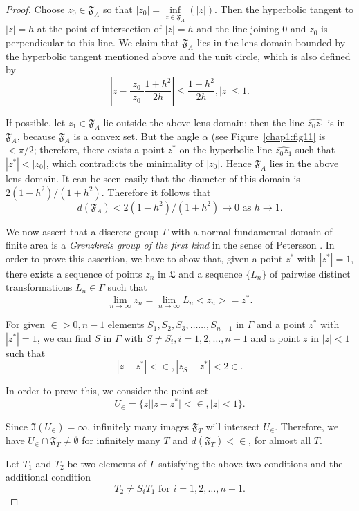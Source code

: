 \begin{proof}
Choose $z_0 \in \mathfrak{F}_A$ so that $|z_0| =
\inf\limits_{z\in \mathfrak{F}_A}(|z|)$. Then the hyperbolic tangent
to $|z|=h$ at the point of intersection of $|z|=h$ and the line
joining $0$ and $z_0$ is perpendicular to this line. We claim that
$\mathfrak{F}_A$ lies in the lens domain bounded by the hyperbolic
tangent mentioned above and the unit circle, which is also defined by 
$$
\left| z - \frac{z_0}{|z_0|} \frac{1+h^2}{2h}\right| \leq
\frac{1-h^2}{2h}, |z| \leq 1.
$$

If possible, let $z_1 \in \mathfrak{F}_A$ lie outside the
above lens domain; then the line $\widehat{z_0z_1}$ is in
$\mathfrak{F}_A$, because $\mathfrak{F}_A$ is a convex set. But the
angle $\alpha$ (see Figure~\ref{chap1:fig11} is $<\pi/2$; therefore, there exists a
point $z^{\ast}$ on the hyperbolic line $\widehat{z_0z_1}$ such that
$|z^{\ast}|<|z_0|$, which contradicts the minimality of $|z_0|$. Hence
$\mathfrak{F}_A$ lies in the above lens domain. It can be seen easily
that the diameter of this domain is $2(1-h^2)/(1+h^2)$. Therefore it
follows that 
$$
d(\mathfrak{F}_A) < 2 (1-h^2)/(1+h^2) \to 0 \text{ as } h \to 1.
$$

We now assert that a discrete group $\Gamma$ with a normal fundamental
domain of finite area is a \textit{Grenzkreis group of the first kind}
in the sense of Petersson \pageoriginale \cite{c1:key3}. In order to prove
this assertion, we have to show that, given a point $z^{\ast}$ with
$|z^{\ast}|=1$, there exists a sequence of points $z_n$ in
$\mathfrak{L}$ and a sequence $\{L_n\}$ of pairwise distinct
transformations $L_n \in \Gamma$ such that 
$$
\lim\limits_{n\to \infty} z_n = \lim\limits_{n\to \infty} L_n <z_n> =
z^{\ast}. 
$$

For given $\in >0, n-1$ elements $S_1, S_2, S_3,\ldots \ldots,
S_{n-1}$ in $\Gamma$ and a point $z^{\ast}$ with $|z^{\ast}|=1$, we
can find $S$ in $\Gamma$ with $S\neq S_i, i=1,2,\ldots, n-1$ and a
point $z$ in $|z|<1$ such that 
$$
|z-z^{\ast}| < \in, |z_S-z^{\ast}| < 2\in. 
$$

In order to prove this, we consider the point set
$$
U_{\in} = \{z||z-z^{\ast}|<\in, |z|<1\}.
$$

Since $\mathfrak{I} (U_{\in}) = \infty$, infinitely many
images $\mathfrak{F}_T$ will intersect $U_{\in}$. Therefore,
we have $U_{\in} \cap \mathfrak{F}_T \neq \emptyset$ for infinitely
many $T$ and $d(\mathfrak{F}_T) < \in$, for almost all $T$.

Let $T_1$ and $T_2$ be two elements of $\Gamma$ satisfying the above
two conditions and the additional condition
$$
T_2 \neq S_i T_1 \text{ for } i = 1, 2, \ldots , n-1.
$$


\end{proof}
